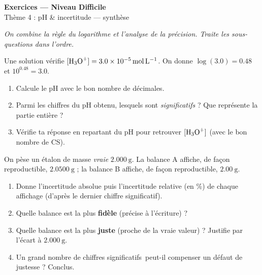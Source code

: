 \documentclass[11pt,a4paper]{article}
\newcommand{\cs}{chiffre significatif}
\newcommand{\CS}{chiffres significatifs}
\begin{document}
\begin{center}
{\Large\bfseries\color{primarydark} Exercices — Niveau Difficile}\\[1pt]
{\color{primary} Thème 4 : pH \& incertitude — synthèse}
\end{center}
\vspace{1mm}
\textit{On combine la règle du logarithme et l'analyse de la précision. Traite les sous-questions dans
l'ordre.}
\vspace{2mm}

\begin{exo}
Une solution vérifie $[\ce{H3O+}]=\num{3,0e-5}\,\si{\mol\per\litre}$. On donne $\log(\num{3,0})=\num{0,48}$
et $10^{\num{0,48}}=\num{3,0}$.
\begin{enumerate}[label=\alph*),leftmargin=1.6em,itemsep=1pt]
  \item Calcule le pH avec le bon nombre de décimales.
  \item Parmi les chiffres du pH obtenu, lesquels sont \emph{significatifs} ? Que représente la partie
        entière ?
  \item Vérifie ta réponse en repartant du pH pour retrouver $[\ce{H3O+}]$ (avec le bon nombre de CS).
\end{enumerate}
\end{exo}

\begin{exo}
On pèse un étalon de masse \emph{vraie} $\qty{2,000}{\gram}$. La balance A affiche, de façon
reproductible, $\qty{2,0500}{\gram}$ ; la balance B affiche, de façon reproductible, $\qty{2,00}{\gram}$.
\begin{enumerate}[label=\alph*),leftmargin=1.6em,itemsep=1pt]
  \item Donne l'incertitude absolue puis l'incertitude relative (en \%) de chaque affichage (d'après
        le dernier \cs).
  \item Quelle balance est la plus \textbf{fidèle} (précise à l'écriture) ?
  \item Quelle balance est la plus \textbf{juste} (proche de la vraie valeur) ? Justifie par l'écart
        à $\qty{2,000}{\gram}$.
  \item Un grand nombre de \CS\ peut-il compenser un défaut de justesse ? Conclus.
\end{enumerate}
\end{exo}
\end{document}
